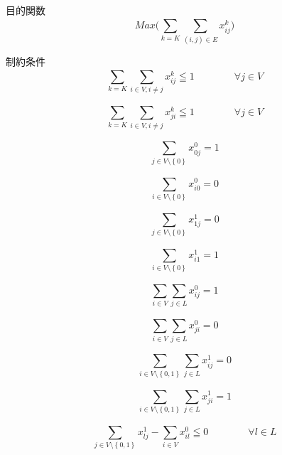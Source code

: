 目的関数
\begin{equation}
  Max\Bigg(\sum_{k=K}^{}\sum_{(i,j)\in E}^{}x_{ij}^{k}\Bigg) \tag{1}
\end{equation}

制約条件
\begin{equation}
  \sum_{k=K}^{}\sum_{i\in V,i\neq j}^{}x_{ij}^{k} \leqq 1
  \qquad\qquad\forall j \in V \tag{2.1}
\end{equation}

\begin{equation}
  \sum_{k=K}^{}\sum_{i\in V,i\neq j}^{}x_{ji}^{k} \leqq 1
  \qquad\qquad\forall j \in V \tag{2.2}
\end{equation}

\begin{equation}
  \sum_{j\in V\setminus\left\{0 \right\}}^{}x_{0j}^{0} = 1 \tag{3.1}
\end{equation}

\begin{equation}
  \sum_{i\in V\setminus\left\{0 \right\}}^{}x_{i0}^{0} = 0 \tag{3.2}
\end{equation}

\begin{equation}
  \sum_{j\in V\setminus\left\{0 \right\}}^{}x_{1j}^{1} = 0 \tag{3.3}
\end{equation}

\begin{equation}
  \sum_{i\in V\setminus\left\{0 \right\}}^{}x_{i1}^{1} = 1 \tag{3.4}
\end{equation}

\begin{equation}
  \sum_{i \in V}^{}\sum_{j\in L}^{}x_{ij}^{0} = 1 \tag{4.1}
\end{equation}

\begin{equation}
  \sum_{i \in V}^{}\sum_{j\in L}^{}x_{ji}^{0} = 0 \tag{4.1}
\end{equation}

\begin{equation}
  \sum_{i \in V\setminus\left\{0,1 \right\}}^{}\sum_{j\in L}^{}x_{ij}^{1} = 0 \tag{4.3}
\end{equation}

\begin{equation}
  \sum_{i \in V\setminus\left\{0,1 \right\}}^{}\sum_{j\in L}^{}x_{ji}^{1} = 1 \tag{4.4}
\end{equation}

\begin{equation}
  \sum_{j \in V\setminus\left\{0,1 \right\}}^{}x_{lj}^{1} - \sum_{i \in V}^{}x_{il}^{0} \leqq 0
  \qquad\qquad\forall l \in L \tag{5}
\end{equation}

